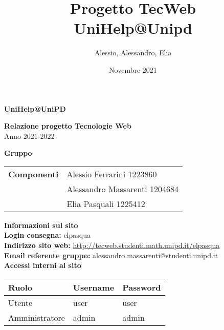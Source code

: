 \documentclass[a4paper, 11pt]{article}
\title{Progetto TecWeb \\ UniHelp@Unipd}
\author{Alessio, Alessandro, Elia}
\date{Novembre 2021}
\begin{document}
\begin{center}
	\textbf{\Huge{UniHelp@UniPD}}\\
\end{center}

\vspace{1.5cm}

\begin{center}
	\textbf{\huge{Relazione progetto Tecnologie Web}}\\[0.2cm]
	\Large{Anno 2021-2022}
\end{center}

\vspace{5pt}

\begin{center}
	\textbf{\Large{Gruppo}}
    \begin{table}[H]
        \hspace{3.5cm}
        \renewcommand{\arraystretch}{1.4}
        \begin{tabular}{l | l}
            \textbf{Componenti} & Alessio Ferrarini 1223860\\
            & Alessandro Massarenti 1204684\\
            & Elia Pasquali 1225412\\
        \end{tabular}
    \end{table}
\end{center}

\hspace{5pt}

\begin{center}
	\textbf{\Large{Informazioni sul sito}}\\
	\textbf{Login consegna:} elpasqua \\
	\textbf{Indirizzo sito web:} \url{http://tecweb.studenti.math.unipd.it/elpasqua}\\
	\textbf{Email referente gruppo:} alessandro.massarenti@studenti.unipd.it\\
    \vspace{1cm}
    \textbf{Accessi interni al sito}
    \begin{longtable}{|l|l|l|}
        \hline
        \rowcolor[HTML]{9B0014}
        {\color[HTML]{FFFFFF} Ruolo} & {\color[HTML]{FFFFFF} Username} & {\color[HTML]{FFFFFF} Password} \\ \hline
        Utente         & user     & user     \\ \hline
        Amministratore & admin    & admin \\ \hline
    \end{longtable}
\end{center}

\pagebreak
\tableofcontents
\pagebreak







\end{document}
